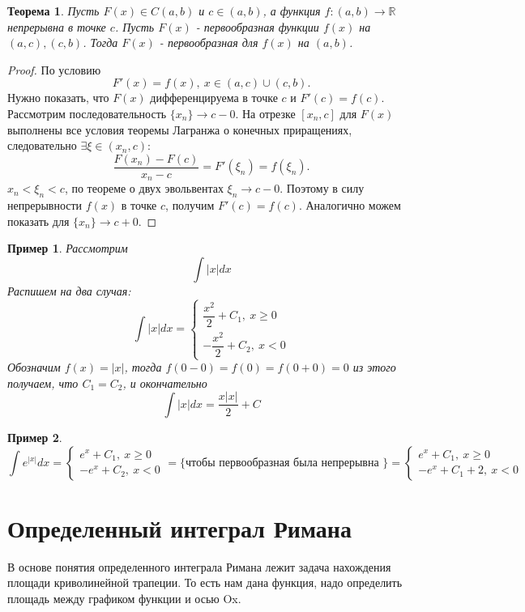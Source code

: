 \documentclass{book} %
\newtheorem{theorem}{Теорема}[chapter] %
\newtheorem{example}{Пример}[chapter] %
\theoremstyle{definition}
\theoremstyle{remark}
\begin{document}
		\begin{theorem}
			Пусть $F(x) \in C(a,b)$ и $c \in (a,b)$, а функция $f: (a,b) \to \mathbb{R}$ непрерывна в точке $c$. Пусть $F(x)$ - первообразная функции $f(x)$ на $(a,c), (c,b)$. Тогда $F(x)$ - первообразная для $f(x)$ на $(a,b)$.
		\end{theorem}
		\begin{proof}
			По условию
			$$
			F'(x) = f(x), \ x \in (a,c) \cup (c,b).
			$$
			Нужно показать, что $F(x)$ дифференцируема в точке $c$ и $F'(c) = f(c)$. \newline
			Рассмотрим последовательность $\{x_n\} \to c - 0$. На отрезке $[x_n, c]$ для $F(x)$ выполнены все условия теоремы Лагранжа о конечных приращениях, следовательно $\exists \xi \in (x_n, c):$
			$$
			\dfrac{F(x_n) - F(c)}{x_n - c} = F'(\xi_n) = f(\xi_n).
			$$
			$x_n < \xi_n< c$, по теореме о двух эвольвентах $\xi_n \to c - 0$. Поэтому в силу непрерывности $f(x)$ в точке $c$, получим $F'(c) = f(c)$. Аналогично можем показать для $\{x_n\} \to c + 0$.
		\end{proof}
		\begin{example}
			Рассмотрим
			$$
			 \int |x| dx $$
			 Распишем на два случая:
			 $$
			 \int |x| dx  = \begin{cases}
			 		\dfrac{x^2}{2} + C_1 , \ x \geq 0\\
			 		-\dfrac{x^2}{2} + C_2, \ x < 0
			 \end{cases}
			 $$		
			 Обозначим $f(x) = |x|$, тогда $f(0-0) = f(0) = f(0+0) = 0$ из этого получаем, что $C_1 = C_2$, и окончательно
			 $$
			 \int |x| dx  = \dfrac{x|x|}{2} + C
			 $$
		\end{example}
		\begin{example}
			$$
			\int e^{|x|}dx = \begin{cases}
				e^{x} + C_1, \ x \geq 0\\
				-e^{x} + C_2, \ x < 0
			\end{cases} = \{\text{чтобы первообразная была непрерывна }\} =
						 \begin{cases}
							e^{x} + C_1, \ x \geq 0\\
							-e^{x} + C_1 + 2, \ x < 0
						\end{cases}
			$$
		\end{example}
	\chapter{Определенный интеграл Римана}
		В основе понятия определенного интеграла Римана лежит задача нахождения площади криволинейной трапеции. То есть нам дана функция, надо определить площадь между графиком функции и осью Ox.
		
\end{document}
